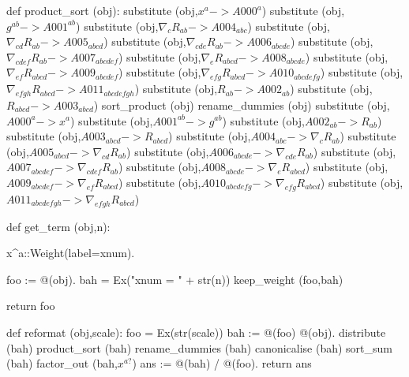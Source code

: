 \documentclass[12pt]{cdblatex}
\begin{document}
\begin{cadabra}
   def product_sort (obj):
       substitute (obj,$ x^{a}                            -> A000^{a}               $)
       substitute (obj,$ g^{a b}                          -> A001^{a b}             $)
       substitute (obj,$ \nabla_{c}{R_{a b}}              -> A004_{a b c}           $)
       substitute (obj,$ \nabla_{c d}{R_{a b}}            -> A005_{a b c d}         $)
       substitute (obj,$ \nabla_{c d e}{R_{a b}}          -> A006_{a b c d e}       $)
       substitute (obj,$ \nabla_{c d e f}{R_{a b}}        -> A007_{a b c d e f}     $)
       substitute (obj,$ \nabla_{e}{R_{a b c d}}          -> A008_{a b c d e}       $)
       substitute (obj,$ \nabla_{e f}{R_{a b c d}}        -> A009_{a b c d e f}     $)
       substitute (obj,$ \nabla_{e f g}{R_{a b c d}}      -> A010_{a b c d e f g}   $)
       substitute (obj,$ \nabla_{e f g h}{R_{a b c d}}    -> A011_{a b c d e f g h} $)
       substitute (obj,$ R_{a b}                          -> A002_{a b}             $)
       substitute (obj,$ R_{a b c d}                      -> A003_{a b c d}         $)
       sort_product   (obj)
       rename_dummies (obj)
       substitute (obj,$ A000^{a}                 -> x^{a}                          $)
       substitute (obj,$ A001^{a b}               -> g^{a b}                        $)
       substitute (obj,$ A002_{a b}               -> R_{a b}                        $)
       substitute (obj,$ A003_{a b c d}           -> R_{a b c d}                    $)
       substitute (obj,$ A004_{a b c}             -> \nabla_{c}{R_{a b}}            $)
       substitute (obj,$ A005_{a b c d}           -> \nabla_{c d}{R_{a b}}          $)
       substitute (obj,$ A006_{a b c d e}         -> \nabla_{c d e}{R_{a b}}        $)
       substitute (obj,$ A007_{a b c d e f}       -> \nabla_{c d e f}{R_{a b}}      $)
       substitute (obj,$ A008_{a b c d e}         -> \nabla_{e}{R_{a b c d}}        $)
       substitute (obj,$ A009_{a b c d e f}       -> \nabla_{e f}{R_{a b c d}}      $)
       substitute (obj,$ A010_{a b c d e f g}     -> \nabla_{e f g}{R_{a b c d}}    $)
       substitute (obj,$ A011_{a b c d e f g h}   -> \nabla_{e f g h}{R_{a b c d}}  $)

   def get_term (obj,n):

       x^{a}::Weight(label=xnum).

       foo := @(obj).
       bah  = Ex("xnum = " + str(n))
       keep_weight (foo,bah)

       return foo

   def reformat (obj,scale):
       foo  = Ex(str(scale))
       bah := @(foo) @(obj).
       distribute     (bah)
       product_sort   (bah)
       rename_dummies (bah)
       canonicalise   (bah)
       sort_sum       (bah)
       factor_out     (bah,$x^{a?}$)
       ans := @(bah) / @(foo).
       return ans


\end{cadabra}
\end{document}
